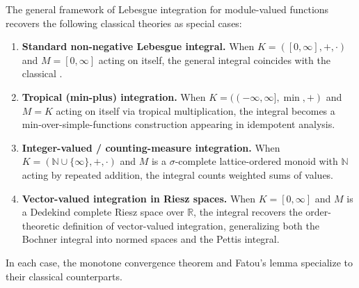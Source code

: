 \begin{proposition} \label{proposition:special_cases_recover_classical_integration_theory}
The general framework of Lebesgue integration for module-valued functions recovers the following classical theories as special cases:

\begin{enumerate}
    \item \textbf{Standard non-negative Lebesgue integral.} When $K = ([0,\infty], +, \cdot)$ and $M = [0,\infty]$ acting on itself, the general integral coincides with the classical .

    \item \textbf{Tropical (min-plus) integration.} When $K = ((-\infty,\infty], \min, +)$ and $M = K$ acting on itself via tropical multiplication, the integral becomes a min-over-simple-functions construction appearing in idempotent analysis.

    \item \textbf{Integer-valued / counting-measure integration.} When $K = (\mathbb{N} \cup \{\infty\}, +, \cdot)$ and $M$ is a $\sigma$-complete lattice-ordered monoid with $\mathbb{N}$ acting by repeated addition, the integral counts weighted sums of values.

    \item \textbf{Vector-valued integration in Riesz spaces.} When $K = [0,\infty]$ and $M$ is a Dedekind complete Riesz space over $\mathbb{R}$, the integral recovers the order-theoretic definition of vector-valued integration, generalizing both the Bochner integral into normed spaces and the Pettis integral.
\end{enumerate}

In each case, the monotone convergence theorem and Fatou's lemma specialize to their classical counterparts.
\end{proposition}
